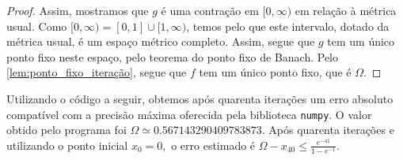 \begin{proof}
    Assim, mostramos que \(g\) é uma contração em \([0, \infty)\) em relação à métrica usual. Como \([0, \infty) = [0,1]\cup[1, \infty)\), temos pelo  que este intervalo, dotado da métrica usual, é um espaço métrico completo. Assim, segue que \(g\) tem um único ponto fixo neste espaço, pelo teorema do ponto fixo de Banach. Pelo \cref{lem:ponto_fixo_iteração}, segue que \(f\) tem um único ponto fixo, que é \(\Omega\).
\end{proof}

Utilizando o código a seguir, obtemos após quarenta iterações um erro absoluto compatível com a precisão máxima oferecida pela biblioteca \verb|numpy|. O valor obtido pelo programa foi \(\Omega \simeq0.567143290409783873\). Após quarenta iterações e utilizando o ponto inicial \(x_0 = 0,\) o erro estimado é \(\Omega - x_{40} \leq \frac{e^{-41}}{1 - e^{-1}}.\)
\begin{listing}[h]
    \inputminted[linenos]{Python}{exercício10.py}
\end{listing}

